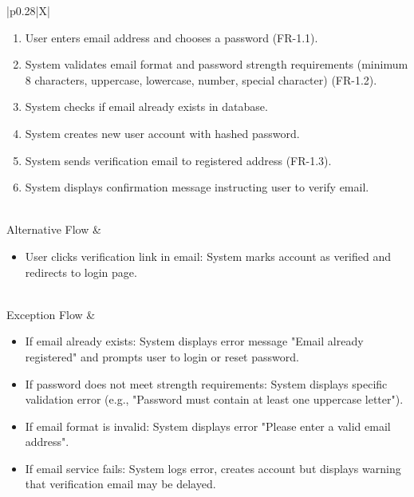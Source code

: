 \begin{minipage}{\textwidth}
\begin{tabularx}{\textwidth}{|p{0.28\textwidth}|X|}
{\begin{enumerate}
            \item User enters email address and chooses a password (FR-1.1).
            \item System validates email format and password strength requirements (minimum 8 characters, uppercase, lowercase, number, special character) (FR-1.2).
            \item System checks if email already exists in database.
            \item System creates new user account with hashed password.
            \item System sends verification email to registered address (FR-1.3).
            \item System displays confirmation message instructing user to verify email.
        \end{enumerate}%
        } \\
    \hline
    Alternative Flow &
        \parbox[t]{\linewidth}{%
        \begin{itemize}
            \item User clicks verification link in email: System marks account as verified and redirects to login page.
        \end{itemize}%
        } \\
    \hline
    Exception Flow &
        \parbox[t]{\linewidth}{%
        \begin{itemize}
            \item If email already exists: System displays error message "Email already registered" and prompts user to login or reset password.
            \item If password does not meet strength requirements: System displays specific validation error (e.g., "Password must contain at least one uppercase letter").
            \item If email format is invalid: System displays error "Please enter a valid email address".
            \item If email service fails: System logs error, creates account but displays warning that verification email may be delayed.
        \end{itemize}%
        } \\
    \hline
\end{tabularx}
\end{minipage}
\bigskip

